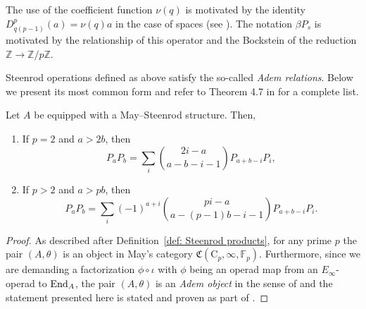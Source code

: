 \begin{remark}
	The use of the coefficient function $\nu(q)$ is motivated by the identity $D_{q(p-1)}^p(a) = \nu(q)a$ in the case of spaces (see \cite[(6.1)]{steenrod1953cyclic}).
	The notation $\beta P_s$ is motivated by the relationship of this operator and the Bockstein of the reduction $\mathbb Z \to \mathbb Z/p\mathbb Z$.
\end{remark}

Steenrod operations defined as above satisfy the so-called \textit{Adem relations}.
Below we present its most common form and refer to Theorem 4.7 in \cite{may1970general} for a complete list.

\begin{lemma}
	Let $A$ be equipped with a May--Steenrod structure.
	Then,
	\begin{enumerate}
		\item If $p = 2$ and $a > 2b$, then
		\begin{equation*}
		P_{a} P_{b} = \sum_i \binom{2i-a}{a-b-i-1} P_{a+b-i}P_i,
		\end{equation*}
		\item If $p > 2$ and $a > pb$, then
		\begin{equation*}
		P_{a} P_{b} = \sum_i (-1)^{a+i} \binom{pi-a}{a-(p-1)b-i-1} P_{a+b-i}P_i.
		\end{equation*}
	\end{enumerate}
\end{lemma}

\begin{proof}
	As described after Definition~\ref{def: Steenrod products}, for any prime $p$ the pair $(A, \theta)$ is an object in May's category $\mathfrak{C}(\mathrm C_p, \infty, \mathbb{F}_p)$.
	Furthermore, since we are demanding a factorization $\phi \circ \iota$ with $\phi$ being an operad map from an $E_\infty$-operad to $\mathrm{End}_A$, the pair $(A, \theta)$ is an \textit{Adem object} in the sense of \cite[Definition 4.1]{may1970general} and the statement presented here is stated and proven as part of \cite[Theorem 4.7]{may1970general}.
\end{proof}

